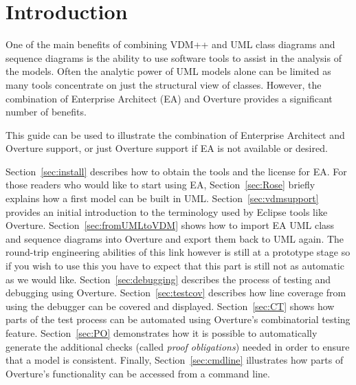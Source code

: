 


\section{Introduction}

One of the main benefits of combining VDM++ and UML class diagrams and
sequence diagrams is
the ability to use software tools to assist in the analysis of the
models. Often the analytic power of UML models alone can be limited as
many tools concentrate on just the structural view of
classes. However, the combination of Enterprise Architect (EA) and
Overture provides a significant number of benefits.

This guide can be used to illustrate the combination of Enterprise
Architect and
Overture support, or just Overture support if EA is
not available or desired.

Section~\ref{sec:install} describes how to obtain the tools and the
license for EA. For those readers who would like to start using
EA, Section~\ref{sec:Rose} briefly explains how a
first model can be built in UML.  Section~\ref{sec:vdmsupport}
provides an initial introduction to the terminology used by Eclipse
tools like Overture. Section~\ref{sec:fromUMLtoVDM} shows how to
import EA UML class and sequence diagrams into Overture and
export them back to UML again. The round-trip engineering abilities of
this link however is still at a prototype stage so if you wish to use
this you have to expect that this part is still not as automatic as we
would like. 
Section~\ref{sec:debugging} describes the process of testing and
debugging using Overture. Section~\ref{sec:testcov}  describes how
line coverage from using the debugger can be covered and displayed. 
Section~\ref{sec:CT} shows how parts of the test process can be 
automated using Overture's combinatorial testing feature.  
Section~\ref{sec:PO} demonstrates how it is possible to automatically 
generate the additional checks (called \emph{proof obligations}) needed 
in order to ensure that a model is
consistent.  Finally, Section~\ref{sec:cmdline} illustrates how parts
of Overture's functionality can be accessed from a command line.




